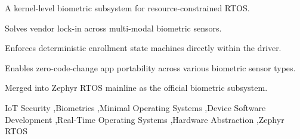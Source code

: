 \documentclass[a4paper,fleqn]{cas-dc}
\begin{document}



\begin{abstract}
Biometric authentication is replacing passwords in IoT devices, but developers face severe fragmentation as sensors ship with proprietary protocols and vendor-locked SDKs. They must choose between resource-heavy userspace frameworks unsuitable for microcontrollers or vendor-specific libraries that create hardware lock-in. We present the Biometric Abstraction for Secure Edge (BASE), the first dedicated kernel-level biometric subsystem for resource-constrained Real-Time Operating Systems. BASE decouples application logic from hardware specifics using driver-enforced state machines, standardized security attributes, and type-safe data structures. We validated BASE across three physical sensor families spanning contact fingerprint and camera-based multi-modal recognition (face and palm vein), with zero application code changes across all three. A minimum footprint of \SI{3.5}{\kilo\byte} Flash and \SI{644}{\byte} RAM confirms suitability for constrained MCUs. BASE has been merged into the Zephyr mainline kernel as the official biometrics subsystem.
\end{abstract}


\begin{highlights}
\item A kernel-level biometric subsystem for resource-constrained RTOS.
\item Solves vendor lock-in across multi-modal biometric sensors.
\item Enforces deterministic enrollment state machines directly within the driver.
\item Enables zero-code-change app portability across various biometric sensor types.
\item Merged into Zephyr RTOS mainline as the official biometric subsystem.
\end{highlights}


\begin{keywords}
 IoT Security \sep Biometrics \sep Minimal Operating Systems \sep Device Software Development \sep Real-Time Operating Systems \sep Hardware Abstraction \sep Zephyr RTOS
\end{keywords}
\end{document}
